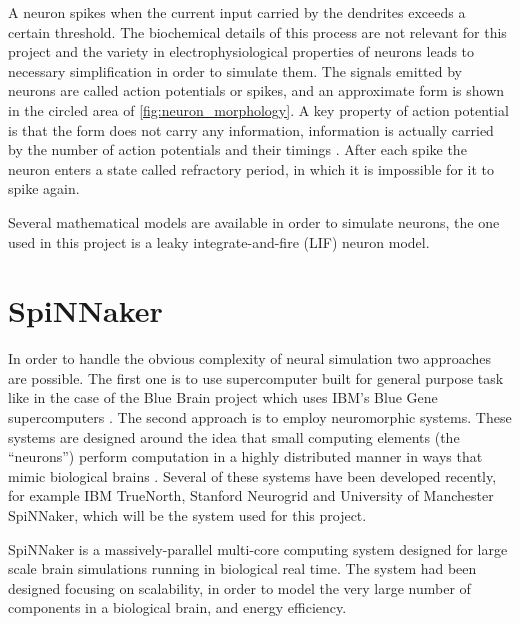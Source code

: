 A neuron spikes when the current input carried by the dendrites exceeds a certain threshold. The biochemical details of this process are not relevant for this project and the variety in electrophysiological properties of neurons \cite{Llinas:2008} leads to necessary simplification in order to simulate them. The signals emitted by neurons are called action potentials or spikes, and an approximate form is shown in the circled area of  \cref{fig:neuron_morphology}. A key property of action potential is that the form does not carry any information, information is actually carried by the number of action potentials and their timings \cite{Gerstner:2014}. After each spike the neuron enters a state called refractory period, in which it is impossible for it to spike again.  

Several mathematical models are available in order to simulate neurons, the one used in this project is a leaky integrate-and-fire (LIF) neuron model. 



\section{SpiNNaker}
In order to handle the obvious complexity of neural simulation two approaches are possible. The first one is to use supercomputer built for general purpose task like in the case of the Blue Brain project which uses IBM's Blue Gene supercomputers \cite{Markram2006}. The second approach is to employ neuromorphic systems. These systems are designed around the idea that small computing elements (the ``neurons'') perform computation in a highly distributed manner in ways that mimic biological brains \cite{Furber2016}. Several of these systems have been developed recently, for example IBM TrueNorth, Stanford Neurogrid and University of Manchester SpiNNaker, which will be the system used for this project.

SpiNNaker is a massively-parallel multi-core computing system designed for large scale brain simulations running in biological real time. The system had been designed focusing on scalability, in order to model the very large number of components in a biological brain, and energy efficiency.

